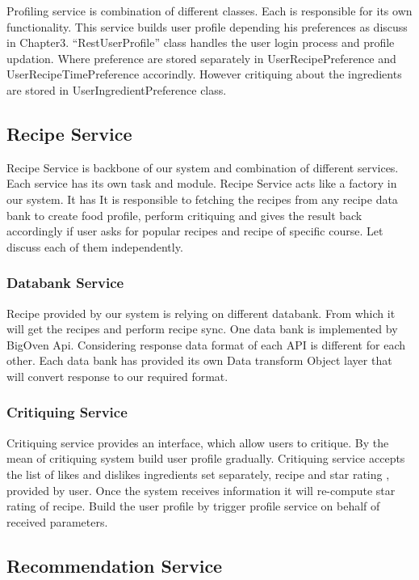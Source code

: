 Profiling service is combination of different classes. Each is responsible for its own functionality. This service builds user profile depending his preferences as discuss in Chapter3. “RestUserProfile” class handles the user login process and profile updation. Where preference are stored separately in UserRecipePreference and UserRecipeTimePreference accorindly. However critiquing about the ingredients are stored in UserIngredientPreference class. 

\subsection{Recipe Service}

Recipe Service is backbone of our system and combination of different services. Each service has its own task and module. Recipe Service acts like a factory in our system.  It has It is responsible to fetching the recipes from any recipe data bank to create food profile, perform critiquing and gives the result back accordingly if user asks for popular recipes and recipe of specific course. Let discuss each of them independently.

\subsubsection{Databank Service}

Recipe provided by our system is relying on different databank. From which it will get the recipes and perform recipe sync. One data bank is implemented by BigOven Api. Considering response data format of each API is different for each other. Each data bank has provided its own Data transform Object layer that will convert response to our required format. 

\subsubsection{Critiquing Service}

Critiquing service provides an interface, which allow users to critique. By the mean of critiquing system build user profile gradually.  Critiquing service accepts the list of likes and dislikes ingredients set separately, recipe and star rating , provided by user. Once the system receives information it will re-compute star rating of recipe. Build the user profile by trigger profile service on behalf of received parameters.

\subsection{Recommendation Service}

